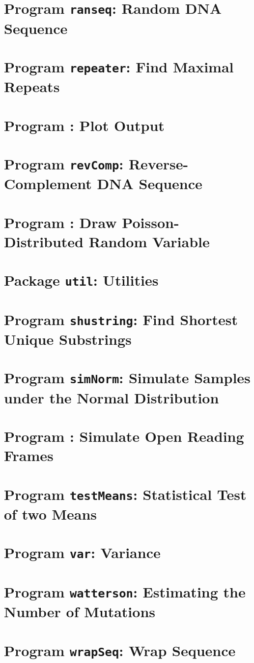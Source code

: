 \documentclass[a4paper]{report}
\begin{document}
\chapter{Program \texttt{ranseq}: Random DNA Sequence}\label{ch:ran}

\chapter{Program \texttt{repeater}: Find Maximal
  Repeats}\label{ch:rep}

\chapter{Program : Plot 
  Output}\label{ch:r2p}

\chapter{Program \texttt{revComp}: Reverse-Complement DNA
  Sequence}\label{ch:rev}

\chapter{Program : Draw Poisson-Distributed Random
  Variable}\label{ch:rpo}

\chapter{Package \texttt{util}: Utilities}\label{ch:uti}

\chapter{Program \texttt{shustring}: Find Shortest Unique Substrings}\label{ch:shu}

\chapter{Program \texttt{simNorm}: Simulate Samples under the Normal
  Distribution}\label{ch:sn}

\chapter{Program : Simulate Open Reading
  Frames}\label{ch:so}

\chapter{Program \texttt{testMeans}: Statistical Test of two Means}\label{ch:tm}

\chapter{Program \texttt{var}: Variance}\label{ch:var}

\chapter{Program \texttt{watterson}: Estimating the Number of Mutations}\label{ch:wat}

\chapter{Program \texttt{wrapSeq}: Wrap Sequence}\label{ch:wra}



\end{document}
